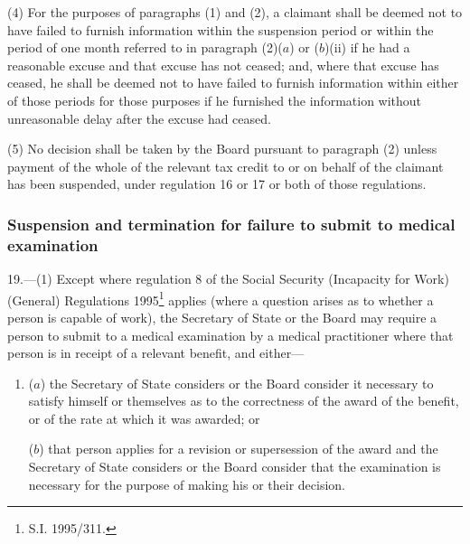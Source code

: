 \documentclass[12pt,a4paper]{article}
\begin{document}
(4) For the purposes of paragraphs (1) and (2), a claimant shall be deemed not to have failed to furnish information within the suspension period or within the period of one month referred to in paragraph (2)($a$)  or ($b$)(ii)  if he had a reasonable excuse and that excuse has not ceased; and, where that excuse has ceased, he shall be deemed not to have failed to furnish information within either of those periods for those purposes if he furnished the information without unreasonable delay after the excuse had ceased.

(5) No decision shall be taken by the Board pursuant to paragraph (2) unless payment of the whole of the relevant tax credit to or on behalf of the claimant has been suspended, under regulation 16 or 17 or both of those regulations.


\subsubsection[19. Suspension and termination for failure to submit to medical examination]{Suspension and termination for failure to submit to medical examination}

19.—(1) Except where regulation 8 of the Social Security (Incapacity for Work) (General) Regulations 1995\footnote{\frenchspacing S.I. 1995/311.} applies (where a question arises as to whether a person is capable of work), the Secretary of State 
or the Board  %
may require a person to submit to a medical examination by a medical practitioner where that person is in receipt of a relevant benefit, and either—
\begin{enumerate}\item[]
($a$) the Secretary of State considers 
or the Board consider  %
it necessary to satisfy himself 
or themselves  %
as to the correctness of the award of the benefit, or of the rate at which it was awarded; or

($b$) that person applies for a revision or supersession of the award and the Secretary of State considers 
or the Board consider  %
that the examination is necessary for the purpose of making his 
or their  %
decision.
\end{enumerate}
\end{document}

